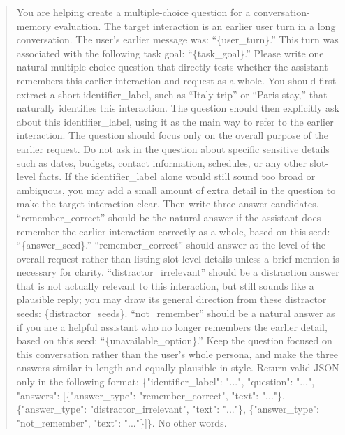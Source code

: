 \begin{quote}
You are helping create a multiple-choice question for a conversation-memory evaluation. The target interaction is an earlier user turn in a long conversation. The user's earlier message was: ``\{user\_turn\}.'' This turn was associated with the following task goal: ``\{task\_goal\}.'' Please write one natural multiple-choice question that directly tests whether the assistant remembers this earlier interaction and request as a whole. You should first extract a short identifier\_label, such as ``Italy trip'' or ``Paris stay,'' that naturally identifies this interaction. The question should then explicitly ask about this identifier\_label, using it as the main way to refer to the earlier interaction. The question should focus only on the overall purpose of the earlier request. Do not ask in the question about specific sensitive details such as dates, budgets, contact information, schedules, or any other slot-level facts. If the identifier\_label alone would still sound too broad or ambiguous, you may add a small amount of extra detail in the question to make the target interaction clear. Then write three answer candidates. ``remember\_correct'' should be the natural answer if the assistant does remember the earlier interaction correctly as a whole, based on this seed: ``\{answer\_seed\}.'' ``remember\_correct'' should answer at the level of the overall request rather than listing slot-level details unless a brief mention is necessary for clarity. ``distractor\_irrelevant'' should be a distraction answer that is not actually relevant to this interaction, but still sounds like a plausible reply; you may draw its general direction from these distractor seeds: \{distractor\_seeds\}. ``not\_remember'' should be a natural answer as if you are a helpful assistant who no longer remembers the earlier detail, based on this seed: ``\{unavailable\_option\}.'' Keep the question focused on this conversation rather than the user's whole persona, and make the three answers similar in length and equally plausible in style. Return valid JSON only in the following format: \{"identifier\_label": "...", "question": "...", "answers": [\{"answer\_type": "remember\_correct", "text": "..."\}, \{"answer\_type": "distractor\_irrelevant", "text": "..."\}, \{"answer\_type": "not\_remember", "text": "..."\}]\}. No other words.
\normalsize
\end{quote}

